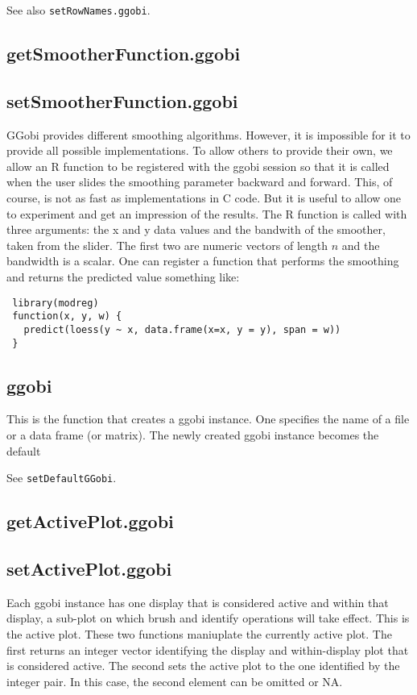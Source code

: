 \documentclass{article}
\def\SFunction#1{{\texttt{\red #1}}}
\begin{document}
See also \SFunction{setRowNames.ggobi}.

\subsection{getSmootherFunction.ggobi}
\subsection{setSmootherFunction.ggobi}
GGobi provides different smoothing algorithms.  However, it is
impossible for it to provide all possible implementations.  To allow
others to provide their own, we allow an R function to be registered
with the ggobi session so that it is called when the user slides the
smoothing parameter backward and forward.  This, of course, is not as
fast as implementations in C code.  But it is useful to allow one to
experiment and get an impression of the results.
The R function is called with three arguments:
the x and y data values and the bandwith of the smoother,
taken from the slider. The first two are numeric vectors of length $n$
and the bandwidth is a scalar.
One can register a function that performs the 
smoothing and returns the predicted value something like:
\begin{verbatim}
 library(modreg)
 function(x, y, w) {
   predict(loess(y ~ x, data.frame(x=x, y = y), span = w))
 }
\end{verbatim}


\subsection{ggobi}
This is the function that creates a ggobi instance.
One specifies the name of a file or a data frame (or matrix).
The newly created ggobi instance becomes the default

See \SFunction{setDefaultGGobi}.


\subsection{getActivePlot.ggobi}
\subsection{setActivePlot.ggobi}
Each ggobi instance has one display that is considered active and
within that display, a sub-plot on which brush and identify operations
will take effect.  This is the active plot.  These two functions
maniuplate the currently active plot.  The first returns an integer
vector identifying the display and within-display plot that is
considered active.  The second sets the active plot to the one
identified by the integer pair.  In this case, the second element can
be omitted or NA.
\end{document}
